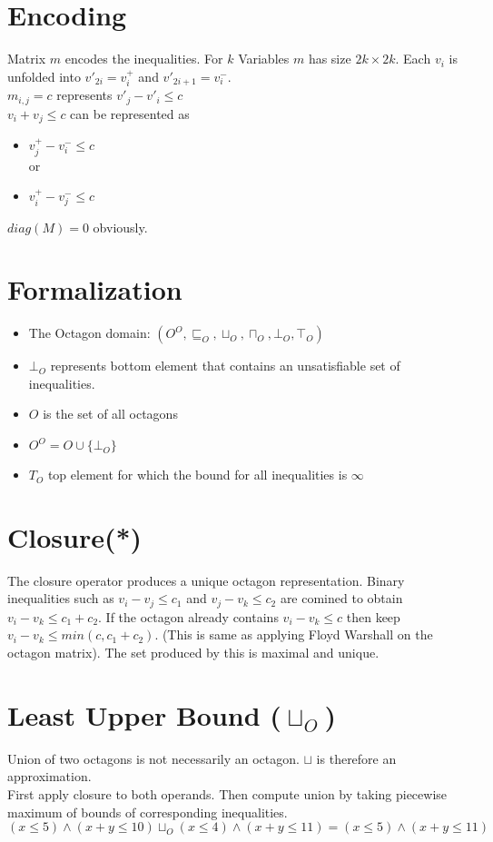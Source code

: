 

\section{Encoding}
Matrix $m$ encodes the inequalities. For $k$ Variables $m$ has size $2k \times 2k$. Each $v_i$ is unfolded into $v'_{2i}=v_i^+$ and $v'_{2i+1}=v_i^-$.\\
$m_{i,j}=c$ represents $v'_j -v'_i \leq c$\\
$v_i + v_j \leq c$ can be represented as
\begin{itemize}
\item $v^+_j - v^-_i \leq c$\\
or
\item $v^+_i - v^-_j \leq c$
\end{itemize}
$diag(M)=0$ obviously.
\section{Formalization}
\begin{itemize}
\item The Octagon domain: $(O^O, \sqsubseteq_O, \sqcup_O, \sqcap_O, \bot_O, \top_O)$
\item $\bot_O$ represents bottom element that contains an unsatisfiable set of inequalities.
\item $O$ is the set of all octagons
\item $O^O=O \cup \{\bot_O\}$
\item $T_O$ top element for which the bound for all inequalities is $\infty$
\end{itemize}
\section{Closure(*)}
\label{octagon_closure}
The closure operator produces a unique octagon representation. Binary inequalities such as $v_i - v_j \leq c_1$ and $v_j - v_k \leq c_2$ are comined to obtain $v_i - v_k \leq c_1 + c_2$. If the octagon already contains $v_i - v_k \leq c$ then keep $v_i - v_k \leq min(c, c_1+c_2)$. (This is same as applying Floyd Warshall on the octagon matrix). The set produced by this is maximal and unique.
\section{Least Upper Bound ($\sqcup_O$)}
Union of two octagons is not necessarily an octagon. $\sqcup$ is therefore an approximation. \\
First apply closure to both operands. Then compute union by taking piecewise maximum of bounds of corresponding inequalities. \\
$(x\leq 5) \wedge (x+y \leq 10) \sqcup_O (x\leq 4) \wedge (x+y\leq 11) = (x\leq 5) \wedge (x+y \leq 11)$
